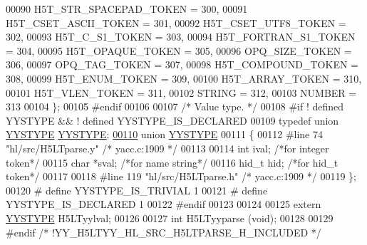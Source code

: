 \begin{DoxyCode}
00090     H5T\_STR\_SPACEPAD\_TOKEN = 300,
00091     H5T\_CSET\_ASCII\_TOKEN = 301,
00092     H5T\_CSET\_UTF8\_TOKEN = 302,
00093     H5T\_C\_S1\_TOKEN = 303,
00094     H5T\_FORTRAN\_S1\_TOKEN = 304,
00095     H5T\_OPAQUE\_TOKEN = 305,
00096     OPQ\_SIZE\_TOKEN = 306,
00097     OPQ\_TAG\_TOKEN = 307,
00098     H5T\_COMPOUND\_TOKEN = 308,
00099     H5T\_ENUM\_TOKEN = 309,
00100     H5T\_ARRAY\_TOKEN = 310,
00101     H5T\_VLEN\_TOKEN = 311,
00102     STRING = 312,
00103     NUMBER = 313
00104   \};
00105 \textcolor{preprocessor}{#endif}
00106 
00107 \textcolor{comment}{/* Value type.  */}
00108 \textcolor{preprocessor}{#if ! defined YYSTYPE && ! defined YYSTYPE\_IS\_DECLARED}
00109 \textcolor{keyword}{typedef} \textcolor{keyword}{union }\hyperlink{union_y_y_s_t_y_p_e}{YYSTYPE} \hyperlink{union_y_y_s_t_y_p_e}{YYSTYPE};
\hyperlink{union_y_y_s_t_y_p_e}{00110} \textcolor{keyword}{union }\hyperlink{union_y_y_s_t_y_p_e}{YYSTYPE}
00111 \{
00112 \textcolor{preprocessor}{#line 74 "hl/src/H5LTparse.y" }\textcolor{comment}{/* yacc.c:1909  */}\textcolor{preprocessor}{}
00113 
00114     \textcolor{keywordtype}{int}     ival;         \textcolor{comment}{/*for integer token*/}
00115     \textcolor{keywordtype}{char}    *sval;        \textcolor{comment}{/*for name string*/}
00116     hid\_t   hid;          \textcolor{comment}{/*for hid\_t token*/}
00117 
00118 \textcolor{preprocessor}{#line 119 "hl/src/H5LTparse.h" }\textcolor{comment}{/* yacc.c:1909  */}\textcolor{preprocessor}{}
00119 \};
00120 \textcolor{preprocessor}{# define YYSTYPE\_IS\_TRIVIAL 1}
00121 \textcolor{preprocessor}{# define YYSTYPE\_IS\_DECLARED 1}
00122 \textcolor{preprocessor}{#endif}
00123 
00124 
00125 \textcolor{keyword}{extern} \hyperlink{union_y_y_s_t_y_p_e}{YYSTYPE} H5LTyylval;
00126 
00127 \textcolor{keywordtype}{int} H5LTyyparse (\textcolor{keywordtype}{void});
00128 
00129 \textcolor{preprocessor}{#endif }\textcolor{comment}{/* !YY\_H5LTYY\_HL\_SRC\_H5LTPARSE\_H\_INCLUDED  */}\textcolor{preprocessor}{}
\end{DoxyCode}
